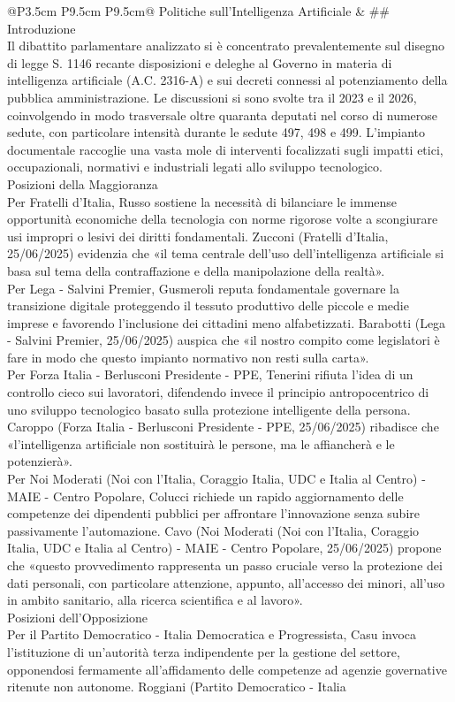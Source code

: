 \documentclass[a4paper,11pt]{article}
\begin{document}
\begin{landscape}
\begin{longtable}{@{}P{3.5cm} P{9.5cm} P{9.5cm}@{}}
\midrule
Politiche sull'Intelligenza Artificiale & \#\# Introduzione\\[6pt] Il dibattito parlamentare analizzato si è concentrato prevalentemente sul disegno di legge S. 1146 recante disposizioni e deleghe al Governo in materia di intelligenza artificiale (A.C. 2316-A) e sui decreti connessi al potenziamento della pubblica amministrazione. Le discussioni si sono svolte tra il 2023 e il 2026, coinvolgendo in modo trasversale oltre quaranta deputati nel corso di numerose sedute, con particolare intensità durante le sedute 497, 498 e 499. L'impianto documentale raccoglie una vasta mole di interventi focalizzati sugli impatti etici, occupazionali, normativi e industriali legati allo sviluppo tecnologico.\\[6pt] Posizioni della Maggioranza\\[6pt] Per Fratelli d'Italia, Russo sostiene la necessità di bilanciare le immense opportunità economiche della tecnologia con norme rigorose volte a scongiurare usi impropri o lesivi dei diritti fondamentali. Zucconi (Fratelli d'Italia, 25/06/2025) evidenzia che «il tema centrale dell'uso dell'intelligenza artificiale si basa sul tema della contraffazione e della manipolazione della realtà».\\[6pt] Per Lega - Salvini Premier, Gusmeroli reputa fondamentale governare la transizione digitale proteggendo il tessuto produttivo delle piccole e medie imprese e favorendo l'inclusione dei cittadini meno alfabetizzati. Barabotti (Lega - Salvini Premier, 25/06/2025) auspica che «il nostro compito come legislatori è fare in modo che questo impianto normativo non resti sulla carta».\\[6pt] Per Forza Italia - Berlusconi Presidente - PPE, Tenerini rifiuta l'idea di un controllo cieco sui lavoratori, difendendo invece il principio antropocentrico di uno sviluppo tecnologico basato sulla protezione intelligente della persona. Caroppo (Forza Italia - Berlusconi Presidente - PPE, 25/06/2025) ribadisce che «l'intelligenza artificiale non sostituirà le persone, ma le affiancherà e le potenzierà».\\[6pt] Per Noi Moderati (Noi con l'Italia, Coraggio Italia, UDC e Italia al Centro) - MAIE - Centro Popolare, Colucci richiede un rapido aggiornamento delle competenze dei dipendenti pubblici per affrontare l'innovazione senza subire passivamente l'automazione. Cavo (Noi Moderati (Noi con l'Italia, Coraggio Italia, UDC e Italia al Centro) - MAIE - Centro Popolare, 25/06/2025) propone che «questo provvedimento rappresenta un passo cruciale verso la protezione dei dati personali, con particolare attenzione, appunto, all'accesso dei minori, all'uso in ambito sanitario, alla ricerca scientifica e al lavoro».\\[6pt] Posizioni dell'Opposizione\\[6pt] Per il Partito Democratico - Italia Democratica e Progressista, Casu invoca l'istituzione di un'autorità terza indipendente per la gestione del settore, opponendosi fermamente all'affidamento delle competenze ad agenzie governative ritenute non autonome. Roggiani (Partito Democratico - Italia 
\end{longtable}
\end{landscape}
\end{document}
